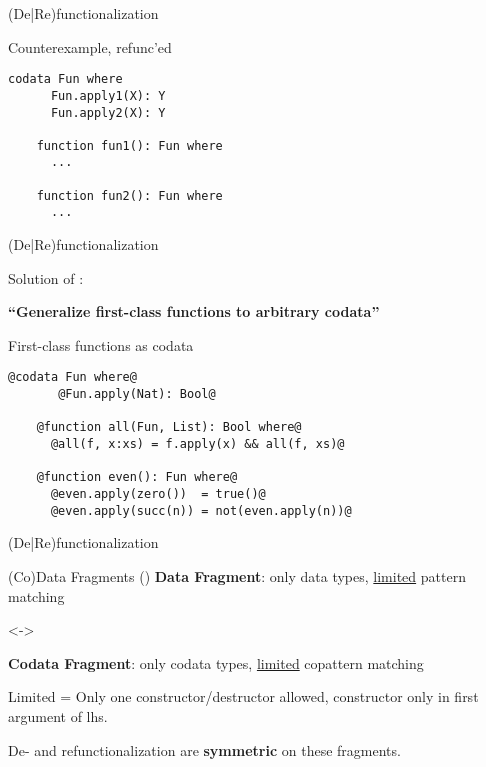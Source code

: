 \documentclass[xcolor=svgnames]{beamer}
\begin{document}
\begin{frame}[fragile]
  {(De|Re)functionalization}
  \begin{block}{Counterexample, refunc'ed}
    \begin{lstlisting}[escapechar=!]
    codata Fun where
      Fun.apply1(X): Y
      Fun.apply2(X): Y

    function fun1(): Fun where
      ...
    
    function fun2(): Fun where
      ...
    \end{lstlisting}
  \end{block}
\end{frame}

\begin{frame}[fragile]
  {(De|Re)functionalization}

Solution of \citet{rendel15automatic}: 

\textbf{``Generalize first-class functions to arbitrary codata''}

\begin{block}{First-class functions as codata}
    \begin{lstlisting}[style=base, gobble=4]
    @codata Fun where@
       @Fun.apply(Nat): Bool@

    @function all(Fun, List): Bool where@
      @all(f, x:xs) = f.apply(x) && all(f, xs)@

    @function even(): Fun where@
      @even.apply(zero())  = true()@
      @even.apply(succ(n)) = not(even.apply(n))@
    \end{lstlisting}
  \end{block}

\end{frame}

\begin{frame}
  {(De|Re)functionalization}

\begin{block}{(Co)Data Fragments (\citeauthor{rendel15automatic})}
  \textbf{Data Fragment}: only data types, \underline{limited} pattern matching

  <->

  \textbf{Codata Fragment}: only codata types, \underline{limited} copattern matching
\end{block}

\begin{block}{}
  Limited = Only one constructor/destructor allowed, constructor only in first argument of lhs.
\end{block}

De- and refunctionalization are \textbf{symmetric} on these fragments.

\end{frame}
\end{document}
